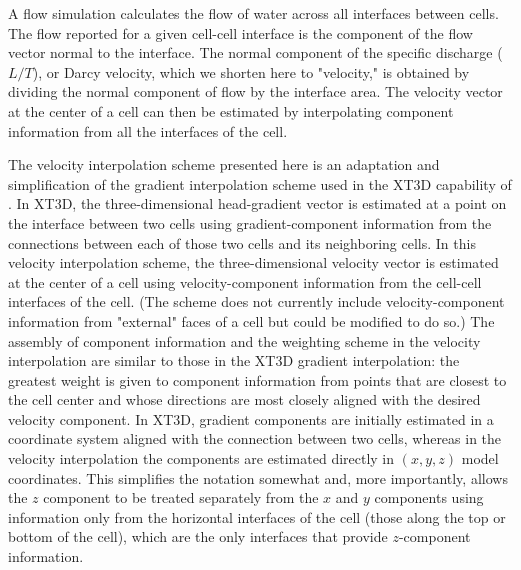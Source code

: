 
A \mf flow simulation calculates the flow of water across all interfaces between cells. The flow reported for a given cell-cell interface is the component of the flow vector normal to the interface. The normal component of the specific discharge ($L/T$), or Darcy velocity, which we shorten here to "velocity," is obtained by dividing the normal component of flow by the interface area. The velocity vector at the center of a cell can then be estimated by interpolating component information from all the interfaces of the cell.

The velocity interpolation scheme presented here is an adaptation and simplification of the gradient interpolation scheme used in the XT3D capability of \mf \citep{modflow6xt3d}. In XT3D, the three-dimensional head-gradient vector is estimated at a point on the interface between two cells using gradient-component information from the connections between each of those two cells and its neighboring cells. In this velocity interpolation scheme, the three-dimensional velocity vector is estimated at the center of a cell using velocity-component information from the cell-cell interfaces of the cell. (The scheme does not currently include velocity-component information from "external" faces of a cell but could be modified to do so.) The assembly of component information and the weighting scheme in the velocity interpolation are similar to those in the XT3D gradient interpolation: the greatest weight is given to component information from points that are closest to the cell center and whose directions are most closely aligned with the desired velocity component. In XT3D, gradient components are initially estimated in a coordinate system aligned with the connection between two cells, whereas in the velocity interpolation the components are estimated directly in $\left( x, y, z \right)$ model coordinates. This simplifies the notation somewhat and, more importantly, allows the $z$ component to be treated separately from the $x$ and $y$ components using information only from the horizontal interfaces of the cell (those along the top or bottom of the cell), which are the only interfaces that provide $z$-component information.

